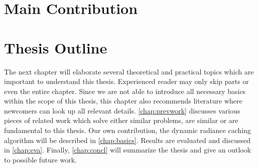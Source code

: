 \documentclass[thesis.tex]{subfiles}
\begin{document}

\section{Main Contribution}

\section{Thesis Outline}
The next chapter will elaborate several theoretical and practical topics which are important to understand this thesis. %
Experienced reader may only skip parts or even the entire chapter.
Since we are not able to introduce all necessary basics within the scope of this thesis, this chapter also recommends literature where newcomers can look up all relevant details.
\autoref{chap:prevwork} discusses various pieces of related work which solve either similar problems, are similar or are fundamental to this thesis.
Our own contribution, the dynamic radiance caching algorithm will be described in \autoref{chap:basics}.
Results are evaluated and discussed in \autoref{chap:eva}.
Finally, \autoref{chap:concl} will summarize the thesis and give an outlook to possible future work.

\subfilebib %
\end{document}
